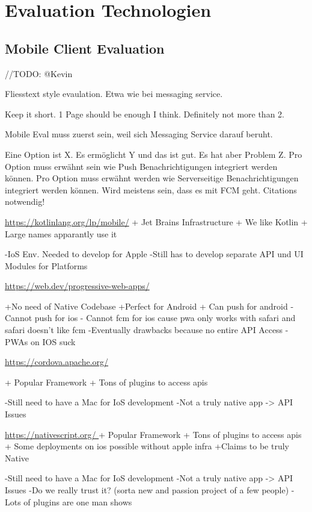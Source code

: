 \section{Evaluation Technologien}\label{sec:evaluation-technologien}

\subsection{Mobile Client Evaluation}\label{subsec:mobile-client-eval}

//TODO: @Kevin

Fliesstext style evaulation. Etwa wie bei messaging service.

Keep it short.
1 Page should be enough I think.
Definitely not more than 2.

Mobile Eval muss zuerst sein, weil sich Messaging Service darauf beruht.

Eine Option ist X. Es ermöglicht Y und das ist gut. Es hat aber Problem Z.
Pro Option muss erwähnt sein wie Push Benachrichtigungen integriert werden können.
Pro Option muss erwähnt werden wie Serverseitige Benachrichtigungen integriert werden können.
Wird meistens sein, dass es mit FCM geht.
Citations notwendig!

\url{https://kotlinlang.org/lp/mobile/}
    + Jet Brains Infrastructure
    + We like Kotlin
    + Large names apparantly use it

    -IoS Env. Needed to develop for Apple 
    -Still has to develop separate API und UI Modules for Platforms 

\url{https://web.dev/progressive-web-apps/ }
	
    +No need of Native Codebase
    +Perfect for Android
    + Can push for android
    - Cannot push for ios
    - Cannot fcm for ios cause pwa only works with safari and safari doesn't like fcm
    -Eventually drawbacks because no entire API Access 
    -PWAs on IOS suck

\url{https://cordova.apache.org/} 

    + Popular Framework
    + Tons of plugins to access apis

    -Still need to have a Mac for IoS development  
    -Not a truly native app -> API Issues
 

\url{https://nativescript.org/ }
    + Popular Framework
    + Tons of plugins to access apis
    + Some deployments on ios possible without apple infra
    +Claims to be truly Native

    -Still need to have a Mac for IoS development
    -Not a truly native app -> API Issues
    -Do we really trust it? (sorta new and passion project of a few people)
    - Lots of plugins are one man shows


